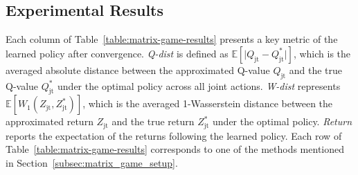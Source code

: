 \documentclass[twoside,11pt]{article}
\newcommand{\utilityexp}{Q}
\newcommand{\utility}{Z}
\newcommand{\joint}{\mathrm{jt}}
\begin{document}
\subsection{Experimental Results}

Each column of Table~\ref{table:matrix-game-results} presents a key metric of the learned policy after convergence. \textit{Q-dist} is defined as $\mathbb{E}[\vert\utilityexp_\joint - \utilityexp^*_\joint\vert]$, which is the averaged absolute distance between the approximated Q-value $\utilityexp_\joint$ and the true Q-value $\utilityexp^*_\joint$ under the optimal policy across all joint actions. \textit{W-dist} represents $\mathbb{E}[W_1(\utility_\joint, \utility^*_\joint)]$, which is the averaged 1-Wasserstein distance between the approximated return $\utility_\joint$ and the true return $\utility^*_\joint$ under the optimal policy. \textit{Return} reports the expectation of the returns following the learned policy.
Each row of Table~\ref{table:matrix-game-results} corresponds to one of the methods mentioned in Section~\ref{subsec:matrix_game_setup}.
\end{document}
